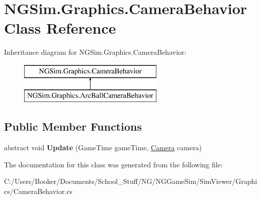 \hypertarget{class_n_g_sim_1_1_graphics_1_1_camera_behavior}{}\section{N\+G\+Sim.\+Graphics.\+Camera\+Behavior Class Reference}
\label{class_n_g_sim_1_1_graphics_1_1_camera_behavior}
Inheritance diagram for N\+G\+Sim.\+Graphics.\+Camera\+Behavior\+:\begin{figure}[H]
\begin{center}
\leavevmode
\includegraphics[height=2.000000cm]{class_n_g_sim_1_1_graphics_1_1_camera_behavior}
\end{center}
\end{figure}
\subsection*{Public Member Functions}
\begin{DoxyCompactItemize}
\item 
\mbox{\label{class_n_g_sim_1_1_graphics_1_1_camera_behavior_aa83a11f4dd47d9a8665918ac2123cb92}} 
abstract void {\bfseries Update} (Game\+Time game\+Time, \hyperlink{class_n_g_sim_1_1_graphics_1_1_camera}{Camera} camera)
\end{DoxyCompactItemize}


The documentation for this class was generated from the following file\+:\begin{DoxyCompactItemize}
\item 
C\+:/\+Users/\+Booker/\+Documents/\+School\+\_\+\+Stuff/\+N\+G/\+N\+G\+Game\+Sim/\+Sim\+Viewer/\+Graphics/Camera\+Behavior.\+cs\end{DoxyCompactItemize}
